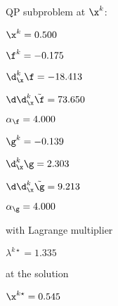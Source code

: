 QP subproblem at $\x^{k}$:

\bigskip
$\x^k=   0.500$


$\f^k =  -0.175$

$\d^k_{\x} \f = -18.413$

$\d\d^k_{\x} \tilde \f =  73.650$

$\alpha_{\footnotesize\f} =   4.000$

\bigskip
$\g^k =  -0.139$

$\d^k_{\x}\g =   2.303$

$\d\d^k_{\x} \tilde \g =   9.213$

$\alpha_{\footnotesize\g} =   4.000$

\bigskip
with Lagrange multiplier

$\lambda^{k\star} =   1.335$

at the solution

$\x^{k\star} =   0.545$

